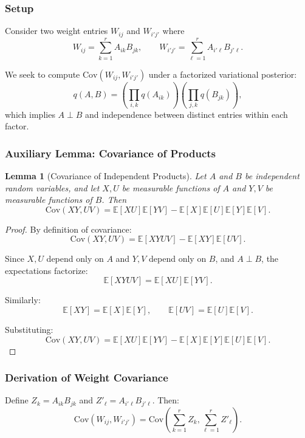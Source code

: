 \documentclass{article}
\theoremstyle{plain}
\newtheorem{lemma}[theorem]{Lemma}
\theoremstyle{definition}
\theoremstyle{remark}
\begin{document}
\subsubsection{Setup}

Consider two weight entries $W_{ij}$ and $W_{i'j'}$ where
\[
W_{ij} = \sum_{k=1}^{r} A_{ik} B_{jk}, 
\qquad 
W_{i'j'} = \sum_{\ell=1}^{r} A_{i'\ell} B_{j'\ell}.
\]

We seek to compute $\mathrm{Cov}(W_{ij}, W_{i'j'})$ under a factorized variational posterior:
\[
q(A, B) = \left(\prod_{i,k} q(A_{ik})\right) \left(\prod_{j,k} q(B_{jk})\right),
\]
which implies $A \perp B$ and independence between distinct entries within each factor.

\subsubsection{Auxiliary Lemma: Covariance of Products}

\begin{lemma}[Covariance of Independent Products]
\label{lem:product_covariance}
Let $A$ and $B$ be independent random variables, and let $X, U$ be measurable functions of $A$ and $Y, V$ be measurable functions of $B$. Then
\[
\mathrm{Cov}(XY, UV) = \mathbb{E}[XU]\mathbb{E}[YV] 
- \mathbb{E}[X]\mathbb{E}[U]\mathbb{E}[Y]\mathbb{E}[V].
\]
\end{lemma}

\begin{proof}
By definition of covariance:
\[
\mathrm{Cov}(XY, UV) = \mathbb{E}[XYUV] - \mathbb{E}[XY]\mathbb{E}[UV].
\]

Since $X, U$ depend only on $A$ and $Y, V$ depend only on $B$, and $A \perp B$, the expectations factorize:
\[
\mathbb{E}[XYUV] = \mathbb{E}[XU]\mathbb{E}[YV].
\]

Similarly:
\[
\mathbb{E}[XY] = \mathbb{E}[X]\mathbb{E}[Y], 
\qquad 
\mathbb{E}[UV] = \mathbb{E}[U]\mathbb{E}[V].
\]

Substituting:
\[
\mathrm{Cov}(XY, UV) = \mathbb{E}[XU]\mathbb{E}[YV] 
- \mathbb{E}[X]\mathbb{E}[Y]\mathbb{E}[U]\mathbb{E}[V].
\]
\end{proof}

\subsubsection{Derivation of Weight Covariance}

Define $Z_k = A_{ik}B_{jk}$ and $Z'_\ell = A_{i'\ell}B_{j'\ell}$. Then:
\[
\mathrm{Cov}(W_{ij}, W_{i'j'}) 
= \mathrm{Cov}\left(\sum_{k=1}^{r} Z_k, \sum_{\ell=1}^{r} Z'_\ell\right).
\]
\end{document}

